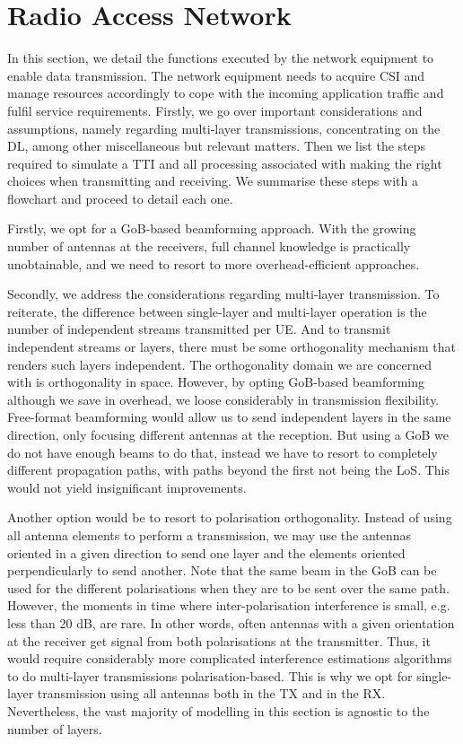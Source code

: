 \section{Radio Access Network}
\label{sec:access}

In this section, we detail the functions executed by the network equipment to enable data transmission. The network equipment needs to acquire \acs{CSI} and manage resources accordingly to cope with the incoming application traffic and fulfil service requirements. Firstly, we go over important considerations and assumptions, namely regarding multi-layer transmissions, concentrating on the \ac{DL}, among other miscellaneous but relevant matters. Then we list the steps required to simulate a \ac{TTI} and all processing associated with making the right choices when transmitting and receiving. We summarise these steps with a flowchart and proceed to detail each one.

Firstly, we opt for a \ac{GoB}-based beamforming approach. With the growing number of antennas at the receivers, full channel knowledge is practically unobtainable, and we need to resort to more overhead-efficient approaches. 

Secondly, we address the considerations regarding multi-layer transmission. To reiterate, the difference between single-layer and multi-layer operation is the number of independent streams transmitted per \ac{UE}. And to transmit independent streams or layers, there must be some orthogonality mechanism that renders such layers independent. The orthogonality domain we are concerned with is orthogonality in space. However, by opting \ac{GoB}-based beamforming although we save in overhead, we loose considerably in transmission flexibility. Free-format beamforming would allow us to send independent layers in the same direction, only focusing different antennas at the reception. But using a \ac{GoB} we do not have enough beams to do that, instead we have to resort to completely different propagation paths, with paths beyond the first not being the \ac{LoS}. This would not yield insignificant improvements. 

Another option would be to resort to polarisation orthogonality. Instead of using all antenna elements to perform a transmission, we may use the antennas oriented in a given direction to send one layer and the elements oriented perpendicularly to send another. Note that the same beam in the GoB can be used for the different polarisations when they are to be sent over the same path. However, the moments in time where inter-polarisation interference is small, e.g. less than 20 dB, are rare. In other words, often antennas with a given orientation at the receiver get signal from both polarisations at the transmitter. Thus, it would require considerably more complicated interference estimations algorithms to do multi-layer transmissions polarisation-based. This is why we opt for single-layer transmission using all antennas both in the \ac{TX} and in the \ac{RX}. Nevertheless, the vast majority of modelling in this section is agnostic to the number of layers.

